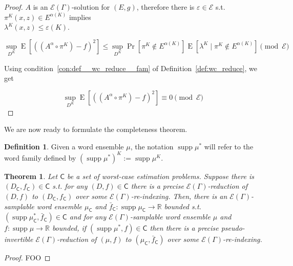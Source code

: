 \documentclass[a4paper]{article}
\numberwithin{equation}{section}
\theoremstyle{definition}
\newtheorem{definition}{Definition}[section]
\theoremstyle{plain}
\newtheorem{theorem}{Theorem}[section]
\DeclareMathOperator{\Supp}{supp}
\DeclareMathOperator{\Prb}{Pr}
\DeclareMathOperator{\E}{E}
\newcommand{\Reals}{\mathbb{R}}
\newcommand{\Fall}{\mathcal{E}}
\newcommand{\EG}{\Fall(\Gamma)}
\begin{document}
\begin{proof}
${A}$ is an ${\EG}$-solution for ${(E,g)}$, therefore there is ${\varepsilon \in \Fall}$ s.t. ${\pi^K(x,z) \in E^{\alpha(K)}}$ implies\\ $\lambda^K(x,z) \leq \varepsilon(K)$.

\[\sup_{D^K} \E[((A^\alpha \circ \pi^K) - f)^2] \leq \sup_{D^K} \Prb[\pi^K \not\in E^{\alpha(K)}] \E[\lambda^K \mid \pi^K \not\in E^{\alpha(K)}] \pmod \Fall\]

Using condition~\ref{con:def__wc_reduce__fam} of Definition~\ref{def:wc_reduce}, we get

\[\sup_{D^K} \E[((A^\alpha \circ \pi^K) - f)^2] \equiv 0 \pmod \Fall\]

%
\end{proof}

We are now ready to formulate the completeness theorem.

\begin{samepage}
\begin{definition}

Given a word ensemble ${\mu}$, the notation ${\Supp \mu^*}$ will refer to the word family defined by ${(\Supp \mu^*)^K:=\Supp \mu^K}$.

\end{definition}
\end{samepage}

\begin{samepage}
\begin{theorem}

Let $\mathsf{C}$ be a set of worst-case estimation problems. Suppose there is $(D_{\mathsf{C}},f_{\mathsf{C}}) \in \mathsf{C}$ s.t. for any $(D,f) \in \mathsf{C}$ there is a precise $\EG$-reduction of $(D,f)$ to $(D_{\mathsf{C}},f_{\mathsf{C}})$ over some $\EG$-re-indexing. Then, there is an $\EG$-samplable word ensemble $\mu_{\mathsf{C}}$ and $\bar{f}_{\mathsf{C}}: \Supp \mu_{\mathsf{C}} \rightarrow \Reals$ bounded s.t. ${(\Supp \mu_{\mathsf{C}}^*, \bar{f}_{\mathsf{C}}) \in \mathsf{C}}$ and for any $\EG$-samplable word ensemble $\mu$ and $f: \Supp \mu \rightarrow \Reals$ bounded, if ${(\Supp \mu^*, f) \in \mathsf{C}}$ then there is a precise pseudo-invertible $\EG$-reduction of $(\mu,f)$ to $(\mu_{\mathsf{C}},\bar{f}_{\mathsf{C}})$ over some $\EG$-re-indexing.

\end{theorem}
\end{samepage}

\begin{proof}

FOO
%
\end{proof}
\end{document}

